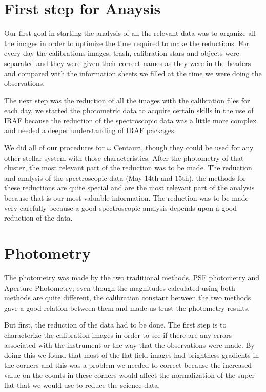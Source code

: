\section{First step for Anaysis}

Our first goal in starting the analysis of all the relevant data was to organize all the images in order to optimize the time required to make the reductions. For every day the calibrations images, trash, calibration stars and objects were separated and they were given their correct names as they were in the headers and compared with the information sheets we filled at the time we were doing the observations.

The next step was the reduction of all the images with the calibration files for each day, we started the photometric data to acquire certain skills in the use of IRAF because the reduction of the spectroscopic data was a little more complex and needed a deeper understanding of IRAF packages. 

We did all of our procedures for $\omega$ Centauri, though they could be used for any other stellar system with those characteristics. After the photometry of that cluster, the most relevant part of the reduction was to be made. The reduction and analysis of the spectroscopic data (May 14th and 15th), the methods for these reductions are quite special and are the most relevant part of the analysis because that is our most valuable information. The reduction was to be made very carefully because a good spectroscopic analysis depends upon a good reduction of the data.

\section{Photometry}

The photometry was made by the two traditional methods, PSF photometry and Aperture Photometry; even though the magnitudes calculated using both methods are quite different, the calibration constant between the two methods gave a good relation between them and made us trust the photometry results.

But first, the reduction of the data had to be done. The first step is to characterize the calibration images in order to see if there are any errors associated with the instrument or the way that the observations were made. By doing this we found that most of the flat-field images had brightness gradients in the corners and this was a problem we needed to correct because the increased value on the counts in these corners would affect the normalization of the super-flat that we would use to reduce the science data. 

